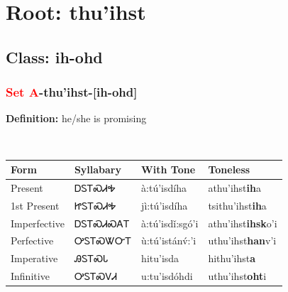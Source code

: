 \needspace{4in}
\section*{Root: thu'ihst}
\nopagebreak
{}
\needspace{3in}
\subsection*{Class: ih-ohd}
\nopagebreak
\needspace{2in}
\subsubsection*{\textcolor{Red}{Set A}{-}\textbf{thu'ihst}{-}[ih-ohd]}
\nopagebreak
\textbf{Definition: } he/she is promising
\\[0.5em]
\begin{tabularx}{\textwidth}{l X X X}%
\toprule%
\textbf{Form}&\textbf{Syllabary}&\textbf{With Tone}&\textbf{Toneless}\\%
\midrule%
Present&ᎠᏚᎢᏍᏗᎭ&à:tú’isdíha&athu'ihst\textbf{ih}a\\%
1st Present&ᏥᏚᎢᏍᏗᎭ&jì:tú’isdíha&tsithu'ihst\textbf{ih}a\\%
Imperfective&ᎠᏚᎢᏍᏗᏍᎪᎢ&à:tú’isdǐ:sgó’i&athu'ihst\textbf{ihsk}o'i\\%
Perfective&ᎤᏚᎢᏍᏔᏅᎢ&ù:tú’istánv́:’i&uthu'ihst\textbf{han}v'i\\%
Imperative&ᎯᏚᎢᏍᏓ&hitu’isda&hithu'ihst\textbf{a}\\%
Infinitive&ᎤᏚᎢᏍᏙᏗ&u:tu’isdóhdi&uthu'ihst\textbf{oht}i\\%
\bottomrule%
\end{tabularx}
\\[1em]
